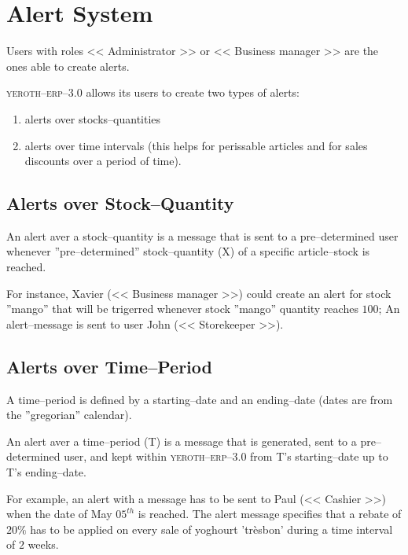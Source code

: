 \documentclass[a4paper, 10pt, twocolumn]{article}
\newcommand{\yeren}{\textsc{yeroth--erp--3.0}\xspace}
\newcommand{\administrator}{<< Administrator >>\xspace}
\newcommand{\manager}{<< Business manager >>\xspace}
\newcommand{\storekeeper}{<< Storekeeper >>\xspace}
\newcommand{\cashier}{<< Cashier >>\xspace}
\begin{document}
\vspace{-1.2em}
\section{Alert System}
\vspace{-0.3em}
Users with roles \administrator or \manager
are the ones able to create alerts.

\yeren allows its users to create two
types of alerts:
\begin{enumerate}[1)]
	\itemsep -0.5em
  \item alerts over stocks--quantities
  \item alerts over time intervals (this helps for
	  perissable articles and for sales discounts
	  over a period of time).
\end{enumerate}

\vspace{-1.1em}
\subsection{Alerts over Stock--Quantity}
\vspace{0em}
An alert aver a stock--quantity is a message that
is sent to a pre--determined user whenever
''pre--determined'' stock--quantity (X) of
a specific article--stock is reached.

For instance, Xavier (\manager) could create
an alert for stock ''mango'' that will be
trigerred whenever stock ''mango'' quantity
reaches $100$; An alert--message is sent
to user John (\storekeeper).

\vspace{-1.1em}
\subsection{Alerts over Time--Period}
\vspace{0em}
A time--period is defined by a
starting--date and an ending--date
(dates are from the ''gregorian'' calendar).

An alert aver a time--period (T) is a message
that is generated, sent to a pre--determined user,
and kept within \yeren from T's starting--date 
up to T's ending--date.

For example, an alert with a message has to be
sent to Paul (\cashier) when the date of May
$05^{th}$ is reached. The alert message
specifies that a rebate of $20\%$ has to be applied
on every sale of yoghourt 'tr\`esbon' during a
time interval of $2$ weeks.
\end{document}
